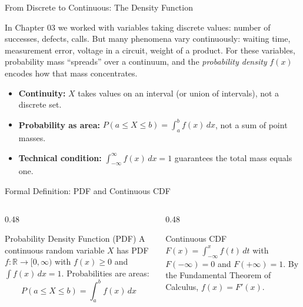 \documentclass[aspectratio=169,xcolor={dvipsnames,table}]{beamer}
\begin{document}
\begin{frame}{From Discrete to Continuous: The Density Function}
	\footnotesize
	\begin{motivacion}
		In Chapter 03 we worked with variables taking discrete values: number of successes, defects, calls. But many phenomena vary continuously: waiting time, measurement error, voltage in a circuit, weight of a product. For these variables, probability mass ``spreads'' over a continuum, and the \emph{probability density} $f(x)$ encodes how that mass concentrates.
	\end{motivacion}
	\vspace{0.15cm}
	\pause
	\begin{itemize}\itemsep=0.1cm
		\item \textbf{Continuity:} $X$ takes values on an interval (or union of intervals), not a discrete set. \pause
		\item \textbf{Probability as area:} $P(a \le X \le b) = \int_{a}^{b} f(x)\,dx$, not a sum of point masses. \pause
		\item \textbf{Technical condition:} $\int_{-\infty}^{\infty} f(x)\,dx = 1$ guarantees the total mass equals one.
	\end{itemize}
\end{frame}

\begin{frame}{Formal Definition: PDF and Continuous CDF}
	\vspace{-0.15cm}
	\begin{columns}[T]
		\begin{column}{0.48\textwidth}
			\begin{block}{Probability Density Function (PDF)}
				\footnotesize
				A continuous random variable $X$ has PDF $f: \mathbb{R} \to [0, \infty)$ with $f(x) \ge 0$ and $\int f(x)\,dx = 1$. Probabilities are areas:
				$$P(a \le X \le b) = \int_{a}^{b} f(x)\,dx$$
			\end{block}
		\end{column}
		\begin{column}{0.48\textwidth}
			\begin{alertblock}{Continuous CDF}
				\footnotesize
				$F(x) = \int_{-\infty}^{x} f(t)\,dt$ with $F(-\infty) = 0$ and $F(+\infty) = 1$. By the Fundamental Theorem of Calculus, $f(x) = F'(x)$.
			\end{alertblock}
		\end{column}
	\end{columns}
\end{frame}
\end{document}
